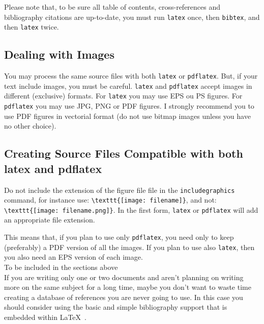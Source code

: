 Please note that, to be sure all table of contents, cross-references and bibliography citations are up-to-date, you must run \verb|latex| once, then \verb|bibtex|, and then \verb|latex| twice.

\subsection{Dealing with Images} %
\label{sub:dealing_with_images}

You may process the same source files with both \verb|latex| or \verb|pdflatex|. But, if your text include images, you must be careful. \verb|latex| and \verb|pdflatex| accept images in different (exclusive) formats.  For \verb|latex| you may use EPS ou PS figures. For \verb|pdflatex| you may use JPG, PNG or PDF figures.  I strongly recommend you to use PDF figures in vectorial format (do not use bitmap images unless you have no other choice).


\subsection{Creating Source Files Compatible with both latex and pdflatex} %
\label{ssec:creating_source_files_compatible_with_both_latex_and_pdflatex}

Do not include the extension of the figure file file in the \verb|includegraphics| command, for instance use: 
\verb|\texttt{[image: filename]}|, and not: \verb|\texttt{[image: filename.png]}|.
In the first form, \verb|latex| or \verb|pdflatex| will add an appropriate file extension.

This means that, if you plan to use only \verb|pdflatex|, you need only to keep (preferably) a PDF version of all the images. If you plan to use also \verb|latex|, then you also need an EPS version of each image.\\

{\Large To be included in the sections above} \\

If you are writing only one or two documents and aren't planning on writing more on the same subject for a long time, maybe you don't want to waste time creating a database of references you are never going to use. In this case you should consider using the basic and simple bibliography support that is embedded within \LaTeX~.

